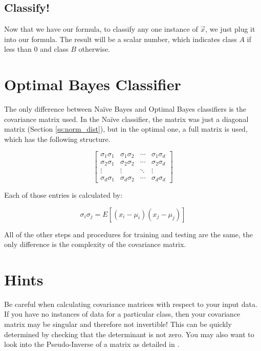 \documentclass{article}
\begin{document}
\subsection{Classify!}

Now that we have our formula, to classify any one instance of
$\vec{x}$, we just plug it into our formula.  The result will be a
scalar number, which indicates class $A$ if less than $0$ and class
$B$ otherwise.



\section{Optimal Bayes Classifier}
\label{sec:obayes}

The only difference between Na\"ive Bayes and Optimal Bayes classifiers
is the covariance matrix used.  In the Na\"ive classifier, the matrix
was just a diagonal matrix (Section \ref{ss:norm_dist}), but in the optimal one,
a full matrix is used, which has the following structure.

\begin{displaymath}
\begin{bmatrix} \sigma_1\sigma_1 & \sigma_1\sigma_2 & \cdots & \sigma_1\sigma_d \\
				 \sigma_2\sigma_1 & \sigma_2\sigma_2 & \cdots & \sigma_2\sigma_d \\
				 \vdots & \vdots & \ddots & \vdots \\
				 \sigma_d\sigma_1 & \sigma_d\sigma_2 & \cdots & \sigma_d\sigma_d
\end{bmatrix}
\end{displaymath}

Each of those entries is calculated by:

\begin{displaymath}
 \sigma_i\sigma_j = E [{(x_i - \mu_i)(x_j - \mu_j)}]
\end{displaymath}

All of the other steps and procedures for training and testing are the
same, the only difference is the complexity of the covariance matrix.


\section{Hints}
\label{sec:hints}

Be careful when calculating covariance matrices with respect to your
input data. If you have no instances of data for a particular class,
then your covariance matrix may be singular and therefore not
invertible!  This can be quickly determined by checking that the
determinant is not zero.  You may also want to look into the Pseudo-Inverse of a
matrix as detailed in \cite{wiki_pinv}.


\end{document}
